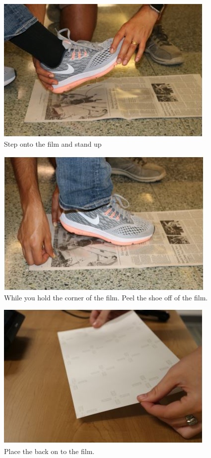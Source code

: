 \begin{figure}[!htp]
\centering
\includegraphics[scale=0.75]{Print_2}
\caption{Step onto the film and stand up}
\label{img:Brush2}
\end{figure}

\begin{figure}[!htp]
\centering
\includegraphics[scale=0.75]{Print_3}
\caption{While you hold the corner of the film. Peel the shoe off of the film.}
\label{img:Brush2}
\end{figure}

\begin{figure}[!htp]
\centering
\includegraphics[scale=0.75]{Back}
\caption{Place the back on to the film.}
\label{img:Brush2}
\end{figure}

